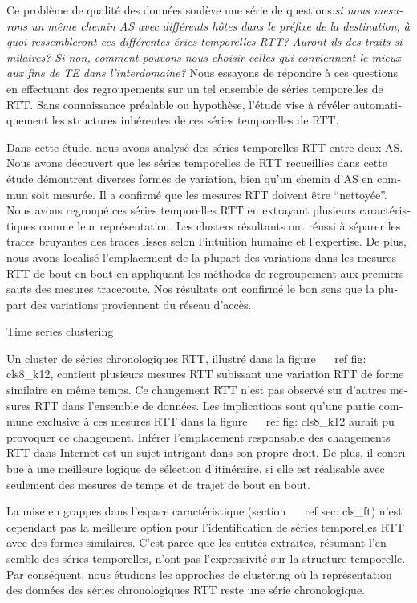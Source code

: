 \begin{otherlanguage}{french}
Ce problème de qualité des données soulève une série de questions:\textit{si nous mesurons un même chemin AS avec différents hôtes dans le préfixe de la destination, 
à quoi ressembleront ces différentes éries temporelles RTT? 
Auront-ils des traits similaires? 
Si non, comment pouvons-nous choisir celles qui conviennent le mieux aux fins de TE dans l'interdomaine?}
Nous essayons de répondre à ces questions en effectuant des regroupements sur un tel ensemble de séries temporelles de RTT.
Sans connaissance préalable ou hypothèse, l'étude vise à révéler automatiquement les structures inhérentes de ces séries temporelles de RTT.

Dans cette étude, nous avons analysé des séries temporelles RTT entre deux AS.
Nous avons découvert que les séries temporelles de RTT recueillies dans cette étude démontrent diverses formes de variation, 
bien qu'un chemin d'AS en commun soit mesurée.
Il a confirmé que les mesures RTT doivent être ``nettoyée''.
Nous avons regroupé ces séries temporelles RTT en extrayant
plusieurs caractéristiques comme leur représentation.
Les clusters résultants ont réussi à séparer les traces bruyantes des traces lisses selon l'intuition humaine et l'expertise.
De plus, nous avons localisé l'emplacement de la plupart des variations dans les mesures RTT de bout en bout en appliquant les méthodes de regroupement aux premiers sauts des mesures traceroute.
Nos résultats ont confirmé le bon sens que la plupart des variations proviennent du réseau d'accès.

Time series clustering

Un cluster de séries chronologiques RTT, illustré dans la figure ~ \ ref {fig: cls8_k12}, contient plusieurs mesures RTT subissant une variation RTT de forme similaire en même temps.
Ce changement RTT n'est pas observé sur d'autres mesures RTT dans l'ensemble de données.
Les implications sont qu'une partie commune exclusive à ces mesures RTT dans la figure ~ \ ref {fig: cls8_k12} aurait pu provoquer ce changement.
Inférer l'emplacement responsable des changements RTT dans Internet est un sujet intrigant dans son propre droit.
De plus, il contribue à une meilleure logique de sélection d'itinéraire, si elle est réalisable avec seulement des mesures de temps et de trajet de bout en bout.

La mise en grappes dans l'espace caractéristique (section ~ \ ref {sec: cls_ft}) n'est cependant pas la meilleure option pour l'identification de séries temporelles RTT avec des formes similaires.
C'est parce que les entités extraites, résumant l'ensemble des séries temporelles, n'ont pas l'expressivité sur la structure temporelle.
Par conséquent, nous étudions les approches de clustering où la représentation des données des séries chronologiques RTT reste une série chronologique.


\end{otherlanguage}
